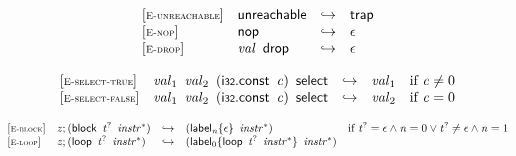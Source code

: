 \vspace{1ex}

\vspace{1ex}

$$
\begin{array}{@{}l@{}lcl@{}l@{}}
{[\textsc{\scriptsize E{-}unreachable}]} \quad & \mathsf{unreachable} &\hookrightarrow& \mathsf{trap} &  \\
{[\textsc{\scriptsize E{-}nop}]} \quad & \mathsf{nop} &\hookrightarrow& \epsilon &  \\
{[\textsc{\scriptsize E{-}drop}]} \quad & {\mathit{val}}~\,\mathsf{drop} &\hookrightarrow& \epsilon &  \\
\end{array}
$$

\vspace{1ex}

$$
\begin{array}{@{}l@{}lcl@{}l@{}}
{[\textsc{\scriptsize E{-}select{-}true}]} \quad & {\mathit{val}}_{{1}}~\,{\mathit{val}}_{{2}}~\,(\mathsf{i{\scriptstyle32}}.\mathsf{const}~\,{\mathit{c}})~\,\mathsf{select} &\hookrightarrow& {\mathit{val}}_{{1}} &\quad
  \mbox{if}~{\mathit{c}} \neq 0 \\
{[\textsc{\scriptsize E{-}select{-}false}]} \quad & {\mathit{val}}_{{1}}~\,{\mathit{val}}_{{2}}~\,(\mathsf{i{\scriptstyle32}}.\mathsf{const}~\,{\mathit{c}})~\,\mathsf{select} &\hookrightarrow& {\mathit{val}}_{{2}} &\quad
  \mbox{if}~{\mathit{c}} = 0 \\
\end{array}
$$

\vspace{1ex}

$$
\begin{array}{@{}l@{}lcl@{}l@{}}
{[\textsc{\scriptsize E{-}block}]} \quad & {\mathit{z}} ; (\mathsf{block}~\,{{\mathit{t}}^?}~\,{{\mathit{instr}}^\ast}) &\hookrightarrow& ({{\mathsf{label}}_{{\mathit{n}}}}{\{\epsilon\}}~\,{{\mathit{instr}}^\ast}) &\quad
  \mbox{if}~{{\mathit{t}}^?} = \epsilon \land {\mathit{n}} = 0 \lor {{\mathit{t}}^?} \neq \epsilon \land {\mathit{n}} = 1 \\
{[\textsc{\scriptsize E{-}loop}]} \quad & {\mathit{z}} ; (\mathsf{loop}~\,{{\mathit{t}}^?}~\,{{\mathit{instr}}^\ast}) &\hookrightarrow& ({{\mathsf{label}}_{0}}{\{\mathsf{loop}~\,{{\mathit{t}}^?}~\,{{\mathit{instr}}^\ast}\}}~\,{{\mathit{instr}}^\ast}) &  \\
\end{array}
$$

